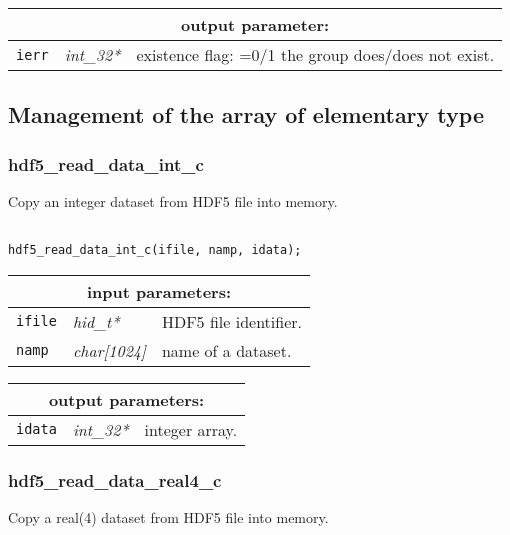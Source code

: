 \vskip 0.8cm

\noindent
\begin{tabular}{|p{1.5cm}|p{2cm}|p{11cm}|}
\hline
\multicolumn{3}{|c|}{\bf output parameter:} \\
\hline
{\tt ierr} & {\it int\_32*} & existence flag: =0/1 the group does/does not exist. \\
\hline
\end{tabular}

\vskip 0.8cm

\subsection{Management of the array of elementary type}

\subsubsection{hdf5\_read\_data\_int\_c}

Copy an integer dataset from HDF5 file into memory.

\begin{verbatim}

hdf5_read_data_int_c(ifile, namp, idata);
\end{verbatim}

\noindent
\begin{tabular}{|p{1.5cm}|p{2cm}|p{11cm}|}
\hline
\multicolumn{3}{|c|}{\bf input parameters:} \\
\hline
{\tt ifile} & {\it hid\_t*} & HDF5 file identifier. \\
\hline
{\tt namp} & {\it char[1024]} & name of a dataset. \\
\hline
\end{tabular}

\vskip 0.8cm

\noindent
\begin{tabular}{|p{1.5cm}|p{2cm}|p{11cm}|}
\hline
\multicolumn{3}{|c|}{\bf output parameters:} \\
\hline
{\tt idata} & {\it int\_32*} & integer array. \\
\hline
\end{tabular}

\subsubsection{hdf5\_read\_data\_real4\_c}

Copy a real(4) dataset from HDF5 file into memory.

